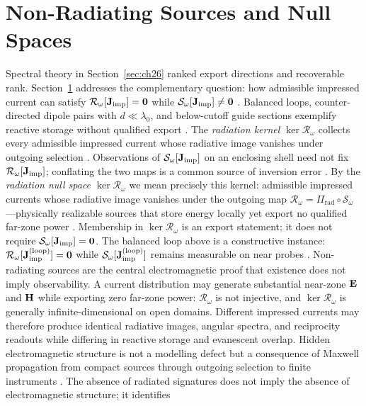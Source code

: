 \section{Non-Radiating Sources and Null Spaces}
\label{sec:ch27}
Spectral theory in Section~\ref{sec:ch26} ranked export directions and recoverable rank.
Section~\ref{sec:ch27} addresses the complementary question: how admissible impressed current can
satisfy $\mathcal{R}_\omega[\mathbf{J}_{\mathrm{imp}}]=\mathbf{0}$ while $\mathcal{S}_\omega[\mathbf{J}_{\mathrm{imp}}]\neq\mathbf{0}$
\cite{devaney2004,stratton1941}. Balanced loops, counter-directed dipole pairs with
$d\ll\lambda_0$, and below-cutoff guide sections exemplify reactive storage without qualified
export \cite{jackson1999,harrington2001}. The \emph{radiation kernel}
$\ker\mathcal{R}_\omega$ collects every admissible impressed current whose radiative image
vanishes under outgoing selection \cite{devaney2004}. Observations of $\mathcal{S}_\omega[\mathbf{J}_{\mathrm{imp}}]$
on an enclosing shell need not fix $\mathcal{R}_\omega[\mathbf{J}_{\mathrm{imp}}]$; conflating the two maps is a
common source of inversion error \cite{hansen1988,stratton1941}.
By the \emph{radiation null space} \(\ker\mathcal{R}_\omega\) we mean precisely this kernel:
admissible impressed currents whose radiative image vanishes under the outgoing map
\(\mathcal{R}_\omega=\Pi_{\mathrm{rad}}\circ\mathcal{S}_\omega\)---physically realizable
sources that store energy locally yet export no qualified far-zone power
\cite{devaney2004}. Membership in \(\ker\mathcal{R}_\omega\) is an export
statement; it does not require \(\mathcal{S}_\omega[\mathbf{J}_{\mathrm{imp}}]=\mathbf{0}\). The balanced loop
above is a constructive instance: \(\mathcal{R}_\omega[\mathbf{J}_{\mathrm{imp}}^{\mathrm{(loop)}}]=\mathbf{0}\)
while \(\mathcal{S}_\omega[\mathbf{J}_{\mathrm{imp}}^{\mathrm{(loop)}}]\) remains measurable on near probes
\cite{devaney2004}.
Non-radiating sources are the central electromagnetic proof that existence does not imply
observability. A current distribution may generate substantial near-zone $\mathbf{E}$ and $\mathbf{H}$ while
exporting zero far-zone power: $\mathcal{R}_\omega$ is not injective, and
$\ker\mathcal{R}_\omega$ is generally infinite-dimensional on open domains. Different impressed
currents may therefore produce identical radiative images, angular spectra, and reciprocity
readouts while differing in reactive storage and evanescent overlap. Hidden electromagnetic
structure is not a modelling defect but a consequence of Maxwell propagation from compact
sources through outgoing selection to finite instruments \cite{stratton1941}. The absence of
radiated signatures does not imply the absence of electromagnetic structure; it identifies

